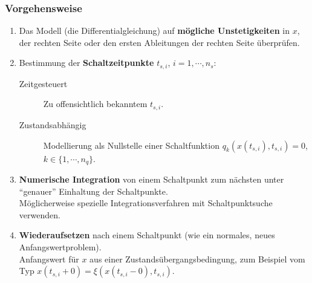\documentclass[a4paper, 11pt, accentcolor = tud3b]{tudreport}
\begin{document}
                \subsubsection{Vorgehensweise} %
                    \begin{enumerate}
                    	\item Das Modell (die Differentialgleichung) auf \textbf{mögliche Unstetigkeiten} in \(x\), der rechten Seite oder den ersten Ableitungen der rechten Seite überprüfen.
                    	\item Bestimmung der \textbf{Schaltzeitpunkte} \( t _ {s,i} \), \( i = 1, \cdots, n _ s \):
	                    	\begin{description}
	                    		\item[Zeitgesteuert] Zu offensichtlich bekanntem \( t _ { s, i } \).
	                    		\item[Zustandsabhängig] Modellierung als Nullstelle einer Schaltfunktion \( q _ k (x(t _ { s, i }), t _ { s, i }) = 0 \), \( k \in \{ 1, \cdots, n _ q \} \).
	                    	\end{description}
	                    \item \textbf{Numerische Integration} von einem Schaltpunkt zum nächsten unter \enquote{genauer} Einhaltung der Schaltpunkte. \\ Möglicherweise spezielle Integrationsverfahren mit Schaltpunktsuche verwenden.
	                    \item \textbf{Wiederaufsetzen} nach einem Schaltpunkt (wie ein normales, neues Anfangswertproblem). \\ Anfangswert für \(x\) aus einer Zustandsübergangsbedingung, zum Beispiel vom Typ \( x(t _ { s, i } + 0) = \xi(x(t _ { s, i } - 0), t _ { s, i }) \).
                    \end{enumerate}
\end{document}
